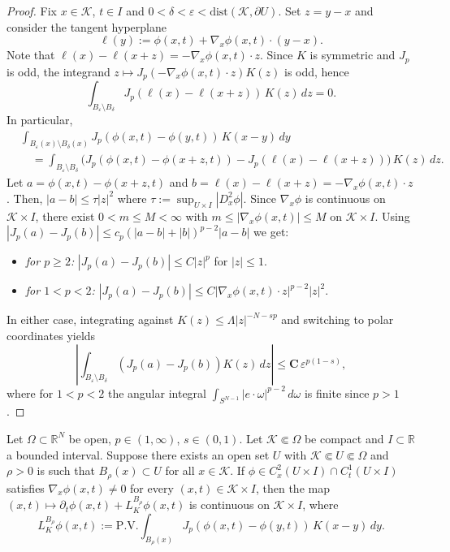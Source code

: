 \documentclass[11pt, a4paper, twoside]{article}
\theoremstyle{definition}
\theoremstyle{remark}
\newcommand{\R}{\mathbb{R}}
\begin{document}
\begin{proof}
Fix $x \in \mathcal{K}$, $t \in I$ and
$0 < \delta < \varepsilon <
\mathrm{dist}(\mathcal{K}, \partial U)$.
Set $z = y - x$ and consider the tangent hyperplane
\[
  \ell(y) := \phi(x,t) + \nabla_x\phi(x,t) \cdot (y-x).
\]
Note that $\ell(x) - \ell(x+z) = -\nabla_x\phi(x,t) \cdot z$.
Since $K$ is symmetric and $J_p$ is odd, the integrand
$z \mapsto J_p(-\nabla_x\phi(x,t) \cdot z)K(z)$ is odd,
hence
\[
  \int_{B_\varepsilon \setminus B_\delta}
  J_p(\ell(x) - \ell(x+z))\, K(z)\, dz = 0.
\]
In particular,
\begin{align*}
  &\int_{B_\varepsilon(x) \setminus B_\delta(x)}
  J_p(\phi(x,t) - \phi(y,t))\, K(x-y)\, dy \\
  &\quad = \int_{B_\varepsilon \setminus B_\delta}
     \bigl(J_p(\phi(x,t)-\phi(x+z,t))
     - J_p(\ell(x)-\ell(x+z))\bigr)\, K(z)\, dz.
\end{align*}
Let $a = \phi(x,t) - \phi(x+z,t)$ and
$b = \ell(x) - \ell(x+z)
= -\nabla_x\phi(x,t) \cdot z$. Then, 
$|a - b| \le \tau |z|^2$
where $\tau := \sup_{U \times I}|D_x^2\phi|$. Since
$\nabla_x\phi$ is continuous on $\mathcal{K} \times I$,
there exist $0 < m \le M < \infty$ with
$m \le |\nabla_x\phi(x,t)| \le M$ on
$\mathcal{K} \times I$. Using
$|J_p(a) - J_p(b)|
\le c_p(|a-b| + |b|)^{p-2}|a-b|$ we get:
\begin{itemize}
  \item \emph{for $p \ge 2$:}
    $|J_p(a) - J_p(b)|
    \le C|z|^p$ for $|z| \le 1$.
  \item \emph{for $1 < p < 2$:}
    $|J_p(a) - J_p(b)|
    \le C|\nabla_x\phi(x,t) \cdot z|^{p-2}|z|^2$.
\end{itemize}
In either case, integrating against
$K(z) \le \Lambda|z|^{-N-sp}$ and switching to polar coordinates yields
\[
  \left|\int_{B_\varepsilon \setminus B_\delta}
  (J_p(a) - J_p(b))K(z)\,dz\right|
  \le \mathbf{C}\,\varepsilon^{p(1-s)},
\]
where for $1 < p < 2$ the angular integral
$\int_{S^{N-1}}|e\cdot\omega|^{p-2}\,d\omega$ is finite
since $p > 1$.
\end{proof}

\begin{lemma}\label{lem:parabolic-full-operator-continuity}
Let $\Omega \subset \R^N$ be open, $p \in (1,\infty)$,
$s \in (0,1)$. Let $\mathcal{K} \Subset \Omega$ be compact
and $I \subset \R$ a bounded interval. Suppose there exists
an open set $U$ with $\mathcal{K} \Subset U \Subset \Omega$ and $\rho > 0$ is such that
$B_\rho(x) \subset U$ for all $x \in \mathcal{K}$.
If $\phi \in C^2_x(U \times I) \cap C^1_t(U \times I)$
satisfies $\nabla_x\phi(x,t) \neq 0$ for every
$(x,t) \in \mathcal{K} \times I$, then the map
$(x,t) \mapsto
\partial_t\phi(x,t) + L_K^{B_\rho}\phi(x,t)$
is continuous on $\mathcal{K} \times I$, where
\[
  L_K^{B_\rho}\phi(x,t)
  := \mathrm{P.V.}\int_{B_\rho(x)}
     J_p(\phi(x,t)-\phi(y,t))\,K(x-y)\,dy.
\]
\end{lemma}
\end{document}
